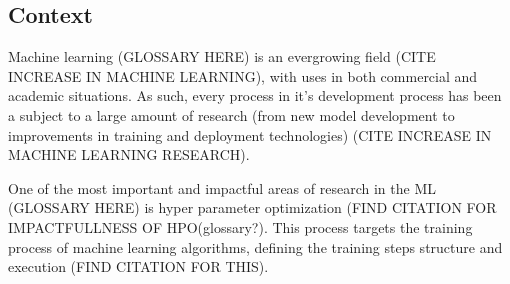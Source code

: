 
\subsection{Context}

Machine learning (GLOSSARY HERE) is an evergrowing field (CITE INCREASE IN MACHINE LEARNING), with uses in both commercial and academic situations. As such, every process in it's development process has been a subject to a large amount of research (from new model development to improvements in training and deployment technologies) (CITE INCREASE IN MACHINE LEARNING RESEARCH).

One of the most important and impactful areas of research in the ML (GLOSSARY HERE) is hyper parameter optimization (FIND CITATION FOR IMPACTFULLNESS OF HPO(glossary?). This process targets the training process of machine learning algorithms, defining the training steps structure and execution (FIND CITATION FOR THIS).
